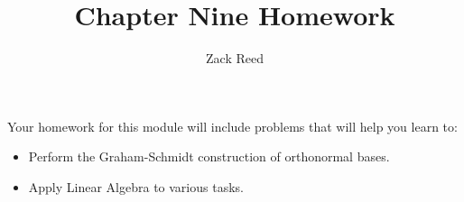 \documentclass{ximera}
\author{Zack Reed}
\title{Chapter Nine Homework}
\begin{document}
 
\begin{abstract}
\end{abstract}
 
\maketitle
 
Your homework for this module will include problems that will help you learn to:
 
\begin{itemize}
\item Perform the Graham-Schmidt construction of orthonormal bases. 
\item Apply Linear Algebra to various tasks.
\end{itemize}
 
 
\end{document}
